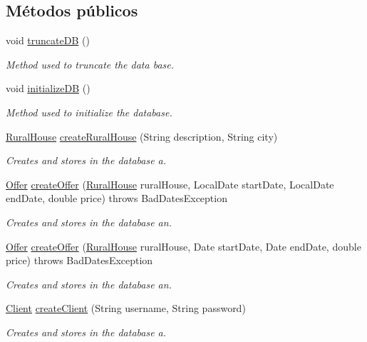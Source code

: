 \subsection*{Métodos públicos}
\begin{DoxyCompactItemize}
\item 
void \mbox{\hyperlink{a00148_a181eb91e600e57fe36301128022f535d}{truncate\+DB}} ()
\begin{DoxyCompactList}\small\item\em Method used to truncate the data base. \end{DoxyCompactList}\item 
void \mbox{\hyperlink{a00148_acab426a4933f3510c317816c136cec0b}{initialize\+DB}} ()
\begin{DoxyCompactList}\small\item\em Method used to initialize the database. \end{DoxyCompactList}\item 
\mbox{\hyperlink{a00188}{Rural\+House}} \mbox{\hyperlink{a00148_a4c8bc4e3b076f4fc75efb878cc2c1c21}{create\+Rural\+House}} (String description, String city)
\begin{DoxyCompactList}\small\item\em Creates and stores in the database a. \end{DoxyCompactList}\item 
\mbox{\hyperlink{a00184}{Offer}} \mbox{\hyperlink{a00148_a0fe06262f78319a1fd4c2fd4e9534db8}{create\+Offer}} (\mbox{\hyperlink{a00188}{Rural\+House}} rural\+House, Local\+Date start\+Date, Local\+Date end\+Date, double price)  throws Bad\+Dates\+Exception
\begin{DoxyCompactList}\small\item\em Creates and stores in the database an. \end{DoxyCompactList}\item 
\mbox{\hyperlink{a00184}{Offer}} \mbox{\hyperlink{a00148_a31f9cb8a3c8f0b42dee19b03f052cd62}{create\+Offer}} (\mbox{\hyperlink{a00188}{Rural\+House}} rural\+House, Date start\+Date, Date end\+Date, double price)  throws Bad\+Dates\+Exception
\begin{DoxyCompactList}\small\item\em Creates and stores in the database an. \end{DoxyCompactList}\item 
\mbox{\hyperlink{a00164}{Client}} \mbox{\hyperlink{a00148_a4671ad8ff75ef8a9195974dbdcd95e7f}{create\+Client}} (String username, String password)
\begin{DoxyCompactList}\small\item\em Creates and stores in the database a. \end{DoxyCompactList}\item 

\end{DoxyCompactItemize}
